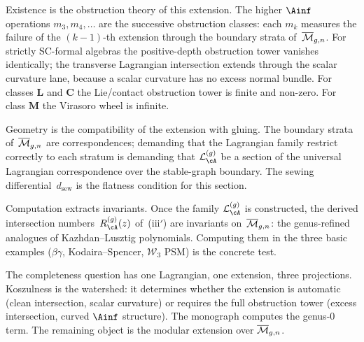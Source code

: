 Existence is the obstruction theory of this extension.
The higher $\Ainf$ operations $m_3, m_4, \ldots$ are the successive
obstruction classes: each $m_k$ measures the failure of the
$(k{-}1)$-th extension through the boundary strata
of~$\overline{\mathcal M}_{g,n}$. For strictly SC-formal algebras the positive-depth
obstruction tower vanishes identically; the transverse Lagrangian
intersection extends through the scalar curvature lane, because a
scalar curvature has no excess normal bundle. For classes
$\mathbf{L}$ and $\mathbf{C}$ the Lie/contact obstruction tower is
finite and non-zero. For class $\mathbf{M}$ the Virasoro wheel is
infinite.

Geometry is the compatibility of the extension with gluing. The
boundary strata of~$\overline{\mathcal M}_{g,n}$ are correspondences; demanding
that the Lagrangian family restrict correctly to each stratum is
demanding that $\cL_\cA^{(g)}$ be a section of the universal
Lagrangian correspondence over the stable-graph boundary. The
sewing differential~$d_{\mathrm{sew}}$ is the flatness condition
for this section.

Computation extracts invariants. Once the family
$\cL_\cA^{(g)}$ is constructed, the derived intersection
numbers~$R^{(g)}_\cA(z)$ of~(iii${}'$) are invariants
on~$\overline{\mathcal M}_{g,n}$: the genus-refined analogues of Kazhdan--Lusztig
polynomials. Computing them in the three basic examples
($\beta\gamma$, Kodaira--Spencer, $\mathcal{W}_3$ PSM) is the
concrete test.

The completeness question has one
Lagrangian, one extension, three projections. Koszulness is the
watershed: it determines whether the extension is automatic
(clean intersection, scalar curvature) or requires the full
obstruction tower (excess intersection, curved $\Ainf$ structure).
The monograph computes the genus-$0$ term. The remaining object is the
modular extension over \(\overline{\mathcal M}_{g,n}\).

\medskip

